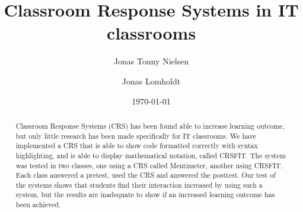 \documentclass{article}
\title{Classroom Response Systems in IT classrooms}
\author{Jonas Tonny Nielsen \and Jonas Lomholdt}
\date{\today}
\begin{document}
\maketitle

\begin{abstract}
Classroom Response Systems (CRS) has been found able to increase learning outcome, but only little research has been made specifically for IT classrooms. We have implemented a CRS that is able to show code formatted correctly with syntax highlighting, and is able to display mathematical notation, called CRSFIT. The system was tested in two classes, one using a CRS called Mentimeter, another using CRSFIT. Each class answered a pretest, used the CRS and answered the posttest. Our test of the systems shows that students find their interaction increased by using such a system, but the results are inadequate to show if an increased learning outcome has been achieved.
\end{abstract}

\tableofcontents

\clearpage
\listoffigures

\listoftables

\lstlistoflistings


\clearpage
 \clearpage

 \clearpage
 \clearpage
 \clearpage
 \clearpage
 \clearpage
 \clearpage



\clearpage

\end{document}
